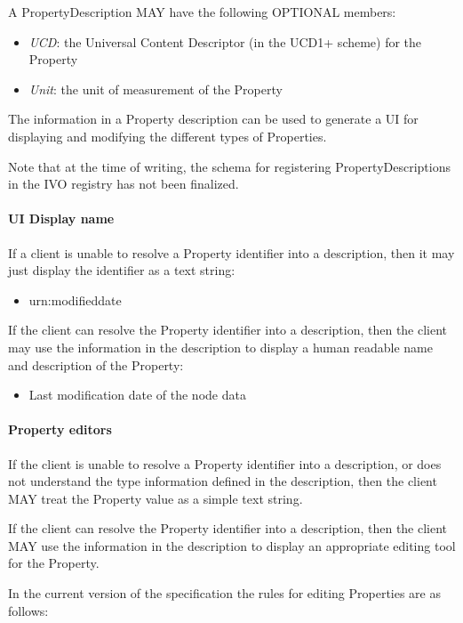 \documentclass[11pt,a4paper]{ivoa}
\begin{document}
A PropertyDescription MAY have the following OPTIONAL members:

\begin{itemize}
    \item \emph{UCD}: the Universal Content Descriptor (in the UCD1+ scheme) for the Property
    \item \emph{Unit}: the unit of measurement of the Property
\end{itemize}

The information in a Property description can be used to generate a UI for displaying and modifying the different types of Properties.

Note that at the time of writing, the schema for registering PropertyDescriptions in the IVO registry has not been finalized.

\paragraph{UI Display name}
If a client is unable to resolve a Property identifier into a description, then it may just display the identifier as a text string:

\begin{itemize}
    \item urn:modifieddate
\end{itemize}

If the client can resolve the Property identifier into a description, then the client may use the information in the description to display a human readable name and description of the Property:

\begin{itemize}
    \item Last modification date of the node data
\end{itemize}

\paragraph{Property editors}
If the client is unable to resolve a Property identifier into a description, or does not understand the type information defined in the description, then the client MAY treat the Property value as a simple text string.

If the client can resolve the Property identifier into a description, then the client MAY use the information in the description to display an appropriate editing tool for the Property.

In the current version of the specification the rules for editing Properties are as follows:
\end{document}
